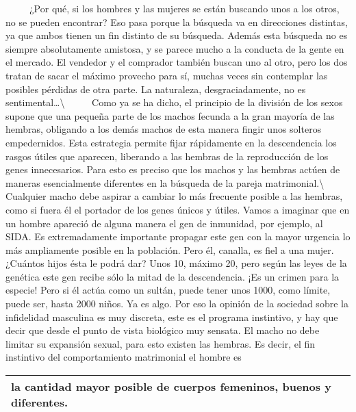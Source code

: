 ~ ~ ~ ¿Por qué, si los hombres y las mujeres se están buscando unos a
los otros, no se pueden encontrar? Eso pasa porque la búsqueda va en
direcciones distintas, ya que ambos tienen un fin distinto de su
búsqueda. Además esta búsqueda no es siempre absolutamente amistosa, y
se parece mucho a la conducta de la gente en el mercado. El vendedor y
el comprador también buscan uno al otro, pero los dos tratan de sacar el
máximo provecho para sí, muchas veces sin contemplar las posibles
pérdidas de otra parte. La naturaleza, desgraciadamente, no es
sentimental\ldots{}\textbackslash{} ~ ~ ~ Como ya se ha dicho, el
principio de la división de los sexos supone que una pequeña parte de
los machos fecunda a la gran mayoría de las hembras, obligando a los
demás machos de esta manera fingir unos solteros empedernidos. Esta
estrategia permite fijar rápidamente en la descendencia los rasgos
útiles que aparecen, liberando a las hembras de la reproducción de los
genes innecesarios. Para esto es preciso que los machos y las hembras
actúen de maneras esencialmente diferentes en la búsqueda de la pareja
matrimonial.\textbackslash{} ~ ~ ~ Cualquier macho debe aspirar a
cambiar lo más frecuente posible a las hembras, como si fuera él el
portador de los genes únicos y útiles. Vamos a imaginar que en un hombre
apareció de alguna manera el gen de inmunidad, por ejemplo, al SIDA. Es
extremadamente importante propagar este gen con la mayor urgencia lo más
ampliamente posible en la población. Pero él, canalla, es fiel a una
mujer. ¿Cuántos hijos ésta le podrá dar? Unos 10, máximo 20, pero según
las leyes de la genética este gen recibe sólo la mitad de la
descendencia. ¡Es un crimen para la especie! Pero si él actúa como un
sultán, puede tener unos 1000, como límite, puede ser, hasta 2000 niños.
Ya es algo. Por eso la opinión de la sociedad sobre la infidelidad
masculina es muy discreta, este es el programa instintivo, y hay que
decir que desde el punto de vista biológico muy sensata. El macho no
debe limitar su expansión sexual, para esto existen las hembras. Es
decir, el fin instintivo del comportamiento matrimonial el hombre es

\begin{longtable}[]{@{}l@{}}
\toprule
la cantidad mayor posible de cuerpos femeninos, buenos y
diferentes.\tabularnewline
\bottomrule
\end{longtable}

